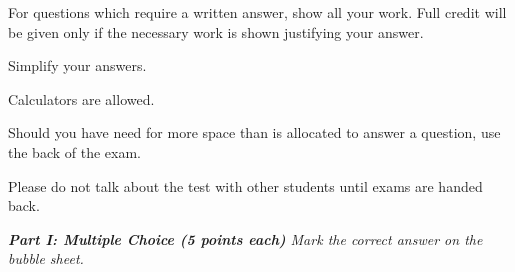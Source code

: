 \documentclass[11pt]{article}
\begin{document}
\Head
\begin{instructions}
\item For questions which require a written answer, show all your work.  Full credit will be given only if the necessary work is shown justifying your answer.
\item Simplify your answers.
\item Calculators are allowed.
\item Should you have need for more space than is allocated to answer a question, use the back of the exam.
\item Please do not talk about the test with other students until exams are handed back.
\end{instructions}
\newpage

\vspace{.2in}

\noindent \emph{{\bf Part I: Multiple Choice (5 points each)} Mark the correct
answer on the bubble sheet.}
\end{document}
